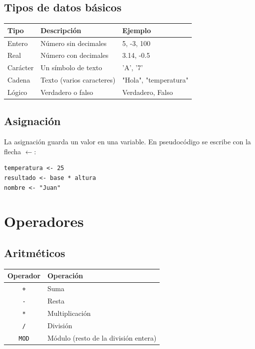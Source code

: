 \subsection{Tipos de datos básicos}

\begin{table}[H]
\centering
\begin{tabular}{lp{5cm}l}
\toprule
Tipo & Descripción & Ejemplo \\
\midrule
Entero & Número sin decimales & 5, -3, 100 \\
Real & Número con decimales & 3.14, -0.5 \\
Carácter & Un símbolo de texto & 'A', '7' \\
Cadena & Texto (varios caracteres) & "Hola", "temperatura" \\
Lógico & Verdadero o falso & Verdadero, Falso \\
\bottomrule
\end{tabular}
\end{table}

\subsection{Asignación}

La asignación guarda un valor en una variable. En pseudocódigo se escribe con la flecha $\leftarrow$:

\begin{lstlisting}[style=estilo-pseudocode]
temperatura <- 25
resultado <- base * altura
nombre <- "Juan"
\end{lstlisting}

\section{Operadores}

\subsection{Aritméticos}

\begin{table}[H]
\centering
\begin{tabular}{cl}
\toprule
Operador & Operación \\
\midrule
\texttt{+} & Suma \\
\texttt{-} & Resta \\
\texttt{*} & Multiplicación \\
\texttt{/} & División \\
\texttt{MOD} & Módulo (resto de la división entera) \\
\bottomrule
\end{tabular}
\end{table}

